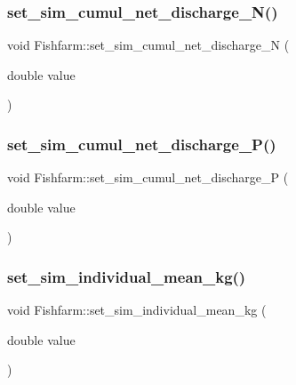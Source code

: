 \mbox{\label{class_fishfarm_a45fc053e6bf14e051bcc11a1cc170827}} 
\subsubsection{\texorpdfstring{set\_sim\_cumul\_net\_discharge\_N()}{set\_sim\_cumul\_net\_discharge\_N()}}
{\footnotesize\ttfamily void Fishfarm\+::set\+\_\+sim\+\_\+cumul\+\_\+net\+\_\+discharge\+\_\+N (\begin{DoxyParamCaption}\item[{double}]{value }\end{DoxyParamCaption})}

\mbox{\label{class_fishfarm_a417fee0d26d67ad764c7befa0214e2b3}} 
\subsubsection{\texorpdfstring{set\_sim\_cumul\_net\_discharge\_P()}{set\_sim\_cumul\_net\_discharge\_P()}}
{\footnotesize\ttfamily void Fishfarm\+::set\+\_\+sim\+\_\+cumul\+\_\+net\+\_\+discharge\+\_\+P (\begin{DoxyParamCaption}\item[{double}]{value }\end{DoxyParamCaption})}

\mbox{\label{class_fishfarm_a9322668eada3ad531c0c9897f640ad3f}} 
\subsubsection{\texorpdfstring{set\_sim\_individual\_mean\_kg()}{set\_sim\_individual\_mean\_kg()}}
{\footnotesize\ttfamily void Fishfarm\+::set\+\_\+sim\+\_\+individual\+\_\+mean\+\_\+kg (\begin{DoxyParamCaption}\item[{double}]{value }\end{DoxyParamCaption})}

